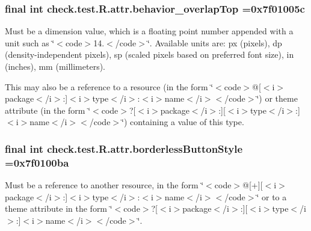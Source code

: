 \subsubsection[{behavior\+\_\+overlap\+Top}]{\setlength{\rightskip}{0pt plus 5cm}final int check.\+test.\+R.\+attr.\+behavior\+\_\+overlap\+Top =0x7f01005c\hspace{0.3cm}{\ttfamily [static]}}\label{classcheck_1_1test_1_1_r_1_1attr_a9be1079997ebc31c25e478abff5ec982}
Must be a dimension value, which is a floating point number appended with a unit such as \char`\"{}$<$code$>$14.\+5sp$<$/code$>$\char`\"{}. Available units are\+: px (pixels), dp (density-\/independent pixels), sp (scaled pixels based on preferred font size), in (inches), mm (millimeters). 

This may also be a reference to a resource (in the form \char`\"{}$<$code$>$@\mbox{[}$<$i$>$package$<$/i$>$\+:\mbox{]}$<$i$>$type$<$/i$>$\+:$<$i$>$name$<$/i$>$$<$/code$>$\char`\"{}) or theme attribute (in the form \char`\"{}$<$code$>$?\mbox{[}$<$i$>$package$<$/i$>$\+:\mbox{]}\mbox{[}$<$i$>$type$<$/i$>$\+:\mbox{]}$<$i$>$name$<$/i$>$$<$/code$>$\char`\"{}) containing a value of this type. \hypertarget{classcheck_1_1test_1_1_r_1_1attr_ab91a7f4468af245ddb54818cf62a7032}{}
\subsubsection[{borderless\+Button\+Style}]{\setlength{\rightskip}{0pt plus 5cm}final int check.\+test.\+R.\+attr.\+borderless\+Button\+Style =0x7f0100ba\hspace{0.3cm}{\ttfamily [static]}}\label{classcheck_1_1test_1_1_r_1_1attr_ab91a7f4468af245ddb54818cf62a7032}
Must be a reference to another resource, in the form \char`\"{}$<$code$>$@\mbox{[}+\mbox{]}\mbox{[}$<$i$>$package$<$/i$>$\+:\mbox{]}$<$i$>$type$<$/i$>$\+:$<$i$>$name$<$/i$>$$<$/code$>$\char`\"{} or to a theme attribute in the form \char`\"{}$<$code$>$?\mbox{[}$<$i$>$package$<$/i$>$\+:\mbox{]}\mbox{[}$<$i$>$type$<$/i$>$\+:\mbox{]}$<$i$>$name$<$/i$>$$<$/code$>$\char`\"{}. \hypertarget{classcheck_1_1test_1_1_r_1_1attr_a8707713c11a1157d48bae6aca2c70613}{}
